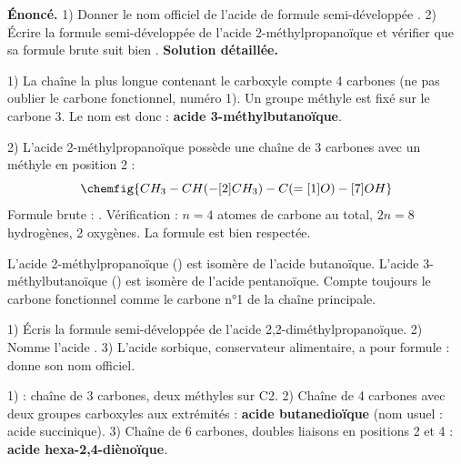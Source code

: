 \documentclass[11pt]{article}
\begin{document}
\begin{exoresolu}
\textbf{Énoncé.} 1) Donner le nom officiel de l'acide de formule semi-développée . 2) Écrire la formule semi-développée de l'acide 2-méthylpropanoïque et vérifier que sa formule brute suit bien .
\tcblower
\textbf{Solution détaillée.}

1) La chaîne la plus longue contenant le carboxyle compte 4 carbones (ne pas oublier le carbone fonctionnel, numéro 1). Un groupe méthyle est fixé sur le carbone 3. Le nom est donc : \textbf{acide 3-méthylbutanoïque}.

2) L'acide 2-méthylpropanoïque possède une chaîne de 3 carbones avec un méthyle en position 2 :
\[ \chemfig{CH_3-CH(-[2]CH_3)-C(=[1]O)-[7]OH} \]
Formule brute : . Vérification : $n = 4$ atomes de carbone au total, $2n = 8$ hydrogènes, 2 oxygènes. La formule  est bien respectée.

\begin{attention}
L'acide 2-méthylpropanoïque () est isomère de l'acide butanoïque. L'acide 3-méthylbutanoïque () est isomère de l'acide pentanoïque. Compte toujours le carbone fonctionnel comme le carbone n°1 de la chaîne principale.
\end{attention}
\end{exoresolu}

\begin{exercice}
1) Écris la formule semi-développée de l'acide 2,2-diméthylpropanoïque. 2) Nomme l'acide . 3) L'acide sorbique, conservateur alimentaire, a pour formule  : donne son nom officiel.
\end{exercice}

\begin{corrige}[Exercice]
1)  : chaîne de 3 carbones, deux méthyles sur C2. 2) Chaîne de 4 carbones avec deux groupes carboxyles aux extrémités : \textbf{acide butanedioïque} (nom usuel : acide succinique). 3) Chaîne de 6 carbones, doubles liaisons en positions 2 et 4 : \textbf{acide hexa-2,4-diènoïque}.
\end{corrige}
\end{document}
